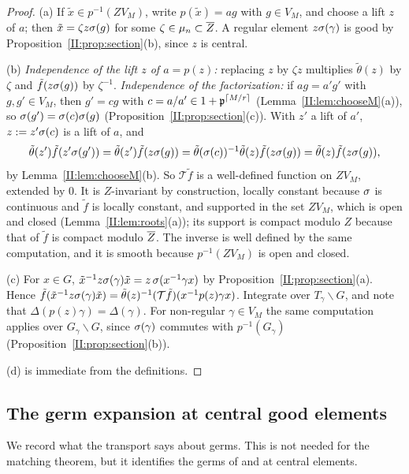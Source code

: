 \begin{proof}
(a) If $\tilde x\in p^{-1}(ZV_M)$, write $p(\tilde x)=ag$ with $g\in V_M$, and choose a lift $z$ of $a$; then $\tilde x=\zeta z\sigma(g)$ for some $\zeta\in\mu_n\subset\overline{Z}$. A regular element $z\sigma(\gamma)$ is good by Proposition~\ref{II:prop:section}(b), since $z$ is central.

(b) \emph{Independence of the lift $z$ of $a=p(z)$:} replacing $z$ by $\zeta z$ multiplies $\tilde\theta(z)$ by $\zeta$ and $\tilde f(z\sigma(g))$ by $\zeta^{-1}$. \emph{Independence of the factorization:} if $ag=a'g'$ with $g,g'\in V_M$, then $g'=cg$ with $c=a/a'\in1+\mathfrak{p}^{\lceil M/r\rceil}$ (Lemma~\ref{II:lem:chooseM}(a)), so $\sigma(g')=\sigma(c)\sigma(g)$ (Proposition~\ref{II:prop:section}(c)). With $z'$ a lift of $a'$, $z:=z'\sigma(c)$ is a lift of $a$, and
\[ \tilde\theta(z')\tilde f(z'\sigma(g'))=\tilde\theta(z')\tilde f(z\sigma(g))=\tilde\theta(\sigma(c))^{-1}\tilde\theta(z)\tilde f(z\sigma(g))=\tilde\theta(z)\tilde f(z\sigma(g)), \]
by Lemma~\ref{II:lem:chooseM}(b). So $\mathcal T\tilde f$ is a well-defined function on $ZV_M$, extended by $0$. It is $Z$-invariant by construction, locally constant because $\sigma$ is continuous and $\tilde f$ is locally constant, and supported in the set $ZV_M$, which is open and closed (Lemma~\ref{II:lem:roots}(a)); its support is compact modulo $Z$ because that of $\tilde f$ is compact modulo $\overline{Z}$. The inverse is well defined by the same computation, and it is smooth because $p^{-1}(ZV_M)$ is open and closed.

(c) For $x\in G$, $\tilde x^{-1}z\sigma(\gamma)\tilde x=z\,\sigma(x^{-1}\gamma x)$ by Proposition~\ref{II:prop:section}(a). Hence $\tilde f(\tilde x^{-1}z\sigma(\gamma)\tilde x)=\tilde\theta(z)^{-1}(\mathcal T\tilde f)(x^{-1}p(z)\gamma x)$. Integrate over $T_\gamma\backslash G$, and note that $\Delta(p(z)\gamma)=\Delta(\gamma)$. For non-regular $\gamma\in V_M$ the same computation applies over $G_\gamma\backslash G$, since $\sigma(\gamma)$ commutes with $p^{-1}(G_\gamma)$ (Proposition~\ref{II:prop:section}(b)).

(d) is immediate from the definitions.
\end{proof}


\subsection{The germ expansion at central good elements}\label{II:subsec:germexp}
We record what the transport says about germs. This is not needed for the matching theorem, but it identifies the germs of \cite[\S8]{FK86} and \cite[\S1]{KP86} at central elements.

